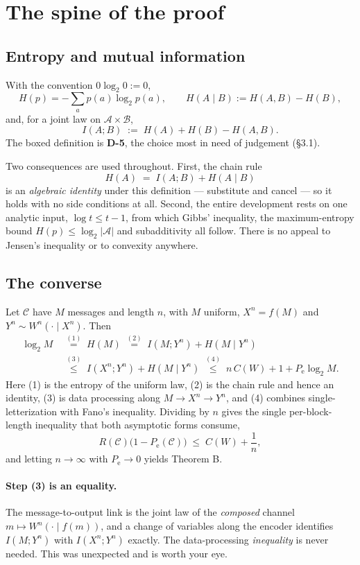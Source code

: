 \documentclass[11pt,a4paper]{article}
\newcommand{\Pe}{P_{\mathrm{e}}}
\newcommand{\code}{\mathcal{C}}
\begin{document}
\section{The spine of the proof}

\subsection{Entropy and mutual information}

With the convention $0\log_2 0 := 0$,
\[
  H(p) = -\sum_{a} p(a)\log_2 p(a),
  \qquad
  H(A\mid B) := H(A,B) - H(B),
\]
and, for a joint law on $\mathcal A\times\mathcal B$,
\[
  \boxed{\;I(A;B) \;:=\; H(A) + H(B) - H(A,B).\;}
\]
The boxed definition is \textbf{D-5}, the choice most in need of judgement
(\S3.1).

Two consequences are used throughout. First, the chain rule
\[
  H(A) \;=\; I(A;B) + H(A\mid B)
\]
is an \emph{algebraic identity} under this definition --- substitute and cancel
--- so it holds with no side conditions at all. Second, the entire development
rests on one analytic input, $\log t \le t-1$, from which Gibbs' inequality, the
maximum-entropy bound $H(p)\le\log_2|\mathcal A|$ and subadditivity all follow.
There is no appeal to Jensen's inequality or to convexity anywhere.

\subsection{The converse}

Let $\code$ have $M$ messages and length $n$, with $M$ uniform, $X^{n}=f(M)$ and
$Y^{n}\sim W^{n}(\cdot\mid X^{n})$. Then
\[
\begin{aligned}
  \log_2 M
  \;&\overset{(1)}{=}\; H(M)
  \;\overset{(2)}{=}\; I(M;Y^{n}) + H(M\mid Y^{n})\\[2pt]
  \;&\overset{(3)}{\le}\; I(X^{n};Y^{n}) + H(M\mid Y^{n})
  \;\overset{(4)}{\le}\; n\,C(W) + 1 + \Pe\log_2 M .
\end{aligned}
\]
Here (1) is the entropy of the uniform law, (2) is the chain rule and hence an
identity, (3) is data processing along $M\to X^{n}\to Y^{n}$, and (4) combines
single-letterization with Fano's inequality. Dividing by $n$ gives the single
per-block-length inequality that both asymptotic forms consume,
\[
  R(\code)\bigl(1-\Pe(\code)\bigr) \;\le\; C(W) + \frac1n ,
\]
and letting $n\to\infty$ with $\Pe\to 0$ yields Theorem B.

\paragraph{Step (3) is an equality.}
The message-to-output link is the joint law of the \emph{composed} channel
$m \mapsto W^{n}(\cdot\mid f(m))$, and a change of variables along the encoder
identifies $I(M;Y^{n})$ with $I(X^{n};Y^{n})$ exactly. The data-processing
\emph{inequality} is never needed. This was unexpected and is worth your eye.
\end{document}
